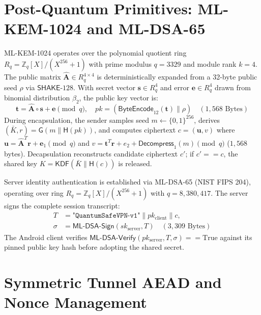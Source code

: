 \section{Post-Quantum Primitives: ML-KEM-1024 and ML-DSA-65}
\label{sec:pqc_primitives_mechanics}

ML-KEM-1024 operates over the polynomial quotient ring $R_q = \mathbb{Z}_q[X] / (X^{256} + 1)$ with prime modulus $q = 3329$ and module rank $k = 4$. The public matrix $\hat{\mathbf{A}} \in R_q^{4 \times 4}$ is deterministically expanded from a 32-byte public seed $\rho$ via $\mathsf{SHAKE}\text{-}128$. With secret vector $\mathbf{s} \in R_q^4$ and error $\mathbf{e} \in R_q^4$ drawn from binomial distribution $\beta_2$, the public key vector is:
\begin{equation}
\mathbf{t} = \hat{\mathbf{A}} \circ \mathbf{s} + \mathbf{e} \pmod q, \quad pk = (\mathsf{ByteEncode}_{12}(\mathbf{t}) \parallel \rho) \quad (1,568\text{ Bytes})
\end{equation}
During encapsulation, the sender samples seed $m \leftarrow \{0, 1\}^{256}$, derives $(\bar{K}, r) = \mathsf{G}(m \parallel \mathsf{H}(pk))$, and computes ciphertext $c = (\mathbf{u}, v)$ where $\mathbf{u} = \hat{\mathbf{A}}^T \mathbf{r} + \mathbf{e}_1 \pmod q$ and $v = \mathbf{t}^T \mathbf{r} + e_2 + \mathsf{Decompress}_1(m) \pmod q$ ($1,568$ bytes). Decapsulation reconstructs candidate ciphertext $c'$; if $c' == c$, the shared key $K = \mathsf{KDF}(\bar{K} \parallel \mathsf{H}(c))$ is released.

Server identity authentication is established via ML-DSA-65 (NIST FIPS 204), operating over ring $R_q = \mathbb{Z}_q[X]/(X^{256} + 1)$ with $q = 8,380,417$. The server signs the complete session transcript:
\begin{equation}
\begin{split}
T & = \texttt{"QuantumSafeVPN-v1"} \parallel pk_{\text{client}} \parallel c, \\
\sigma & = \mathsf{ML}\text{-}\mathsf{DSA}\text{-}\mathsf{Sign}(sk_{\text{server}}, T) \quad (3,309\text{ Bytes})
\end{split}
\end{equation}
The Android client verifies $\mathsf{ML}\text{-}\mathsf{DSA}\text{-}\mathsf{Verify}(pk_{\text{server}}, T, \sigma) == \text{True}$ against its pinned public key hash before adopting the shared secret.

\section{Symmetric Tunnel AEAD and Nonce Management}
\label{sec:symmetric_tunnel_aead}

